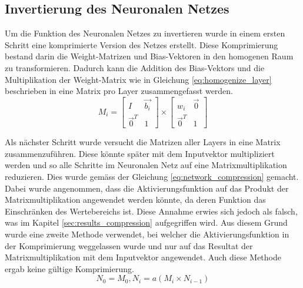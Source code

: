 \documentclass[Interploate_hadwritten_Digits.tex]{subfiles}
\begin{document}
	\subsection{Invertierung des Neuronalen Netzes}
	\label{sec:method_compress}
	Um die Funktion des Neuronalen Netzes zu invertieren wurde in einem ersten Schritt eine komprimierte Version des Netzes erstellt. Diese Komprimierung bestand darin die Weight-Matrizen und Bias-Vektoren in den homogenen Raum zu transformieren. Dadurch kann die Addition des Bias-Vektors und die Multiplikation der Weight-Matrix wie in Gleichung \ref{eq:homogenize_layer} beschrieben in eine Matrix pro Layer zusammengefasst werden. 
	\begin{equation}
		M_{i} =
		\begin{bmatrix}
		I & \vec{b_{i}} \\ 
		\vec{0}^{T} & 1
		\end{bmatrix}
		\times
		\begin{bmatrix}
		w_{i} & \vec{0} \\ 
		\vec{0}^{T} & 1 
		\end{bmatrix}
		\label{eq:homogenize_layer}
	\end{equation}
	
	Als nächster Schritt wurde versucht die Matrizen aller Layers in eine Matrix zusammenzuführen. Diese könnte später mit dem Inputvektor multipliziert werden und so alle Schritte im Neuronalen Netz auf eine Matrixmultiplikation reduzieren. Dies wurde gemäss der Gleichung \ref{eq:network_compression} gemacht. Dabei wurde angenommen, dass die Aktivierungsfunktion auf das Produkt der Matrixmultiplikation angewendet werden könnte, da deren Funktion das Einschränken des Wertebereichs ist. Diese Annahme erwies sich jedoch als falsch, was im Kapitel \ref{sec:results_compression} aufgegriffen wird. Aus diesem Grund wurde eine zweite Methode verwendet, bei welcher die Aktivierungsfunktion in der Komprimierung weggelassen wurde und nur auf das Resultat der Matrixmultiplikation mit dem Inputvektor angewendet.  Auch diese Methode ergab keine gültige Komprimierung.
	\begin{equation}
		N_{0} = M_{0},
		N_{i} = a(M_{i} \times N_{i - 1})
		\label{eq:network_compression}
	\end{equation}
	
\end{document}
